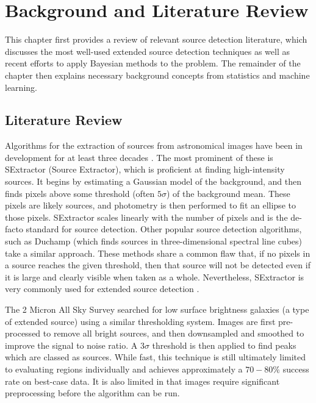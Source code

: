 \chapter{Background and Literature Review}\label{c:background}

This chapter first provides a review of relevant source detection literature, which discusses the most well-used extended source detection techniques as well as recent efforts to apply Bayesian methods to the problem. The remainder of the chapter then explains necessary background concepts from statistics and machine learning.

\section{Literature Review}
Algorithms for the extraction of sources from astronomical images have been in development for at least three decades \cite{jarvis1981focas}. The most prominent of these is SExtractor\cite{bertin1996sextractor} (Source Extractor), which is proficient at finding high-intensity sources. It begins by estimating a Gaussian model of the background, and then finds pixels above some threshold (often $5\sigma$) of the background mean. These pixels are likely sources, and photometry is then performed to fit an ellipse to those pixels. SExtractor scales linearly with the number of pixels and is the de-facto standard for source detection. Other popular source detection algorithms, such as Duchamp \cite{whiting2012duchamp} (which finds sources in three-dimensional spectral line cubes) take a similar approach. These methods share a common flaw that, if no pixels in a source reaches the given threshold, then that source will not be detected even if it is large and clearly visible when taken as a whole. Nevertheless, SExtractor is very commonly used for extended source detection \cite{dalcanton1997number} \cite{longozautomated}.

The 2 Micron All Sky Survey \cite{jarrett20002mass} searched for low surface brightness galaxies (a type of extended source) using a similar thresholding system. Images are first pre-processed to remove all bright sources, and then downsampled and smoothed to improve the signal to noise ratio. A $3\sigma$ threshold is then applied to find peaks which are classed as sources. While fast, this technique is still ultimately limited to evaluating regions individually and achieves approximately a $70-80\%$ success rate on best-case data. It is also limited in that images require significant preprocessing before the algorithm can be run.

